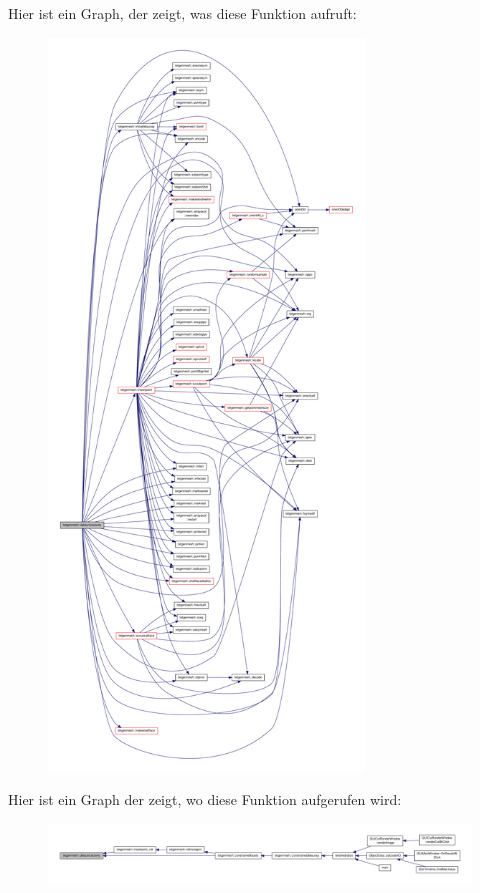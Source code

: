 Hier ist ein Graph, der zeigt, was diese Funktion aufruft\-:\nopagebreak
\begin{figure}[H]
\begin{center}
\leavevmode
\includegraphics[height=550pt]{classtetgenmesh_ab1a82368937a13996efae911b8b1fded_cgraph}
\end{center}
\end{figure}




Hier ist ein Graph der zeigt, wo diese Funktion aufgerufen wird\-:\nopagebreak
\begin{figure}[H]
\begin{center}
\leavevmode
\includegraphics[width=350pt]{classtetgenmesh_ab1a82368937a13996efae911b8b1fded_icgraph}
\end{center}
\end{figure}


